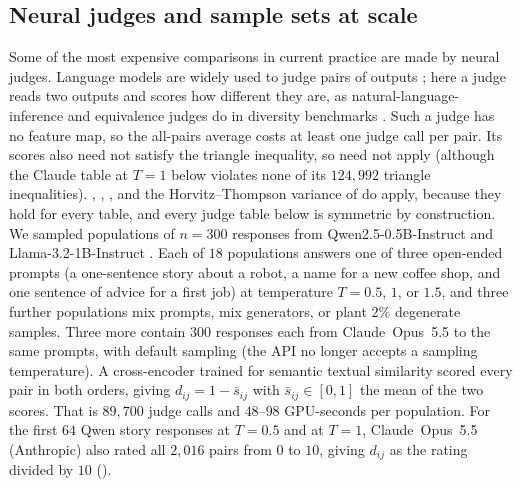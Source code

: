 \subsection{Neural judges and sample sets at scale}
\label{sec:exp-judge}

Some of the most expensive comparisons in current practice are made by
neural judges. Language models are widely used to judge pairs of outputs
\citep{zheng2023judging}; here a judge reads two outputs and scores how
different they are, as natural-language-inference and equivalence judges do
in diversity benchmarks \citep{stasaski2022semantic,zhang2025noveltybench}. Such a judge has no feature map, so the
all-pairs average costs at least one judge call per pair. Its scores also
need not satisfy the triangle inequality, so  need not
apply (although the Claude table at $T=1$ below violates none of its
$124{,}992$ triangle inequalities).
, ,
, and the Horvitz--Thompson variance of  do apply, because
they hold for every table, and every judge table below is symmetric by
construction. We sampled populations of $n=300$ responses from
\mbox{Qwen2.5-0.5B-Instruct} \citep{qwen2024qwen25} and
\mbox{Llama-3.2-1B-Instruct} \citep{grattafiori2024llama}. Each of $18$
populations answers one of three open-ended prompts (a one-sentence story about a robot, a name for a new coffee shop, and one sentence of advice for a first job) at temperature $T=0.5$,
$1$, or $1.5$, and three further populations mix prompts, mix generators,
or plant $2\%$ degenerate samples. Three more contain $300$ responses each
from Claude~Opus~5.5 to the same prompts, with default sampling (the API no
longer accepts a sampling temperature). A cross-encoder trained for semantic
textual similarity \citep[STS;][]{reimers2019sentence,cer2017semeval} scored every
pair in both orders, giving $d_{ij}=1-\bar s_{ij}$ with $\bar s_{ij}\in[0,1]$
the mean of the two scores. That is $89{,}700$ judge calls and $48$--$98$
GPU-seconds per population. For the first $64$ Qwen story responses at
$T=0.5$ and at $T=1$, Claude~Opus~5.5 (Anthropic) also rated all $2{,}016$
pairs from $0$ to $10$, giving $d_{ij}$ as the rating divided by $10$
().

